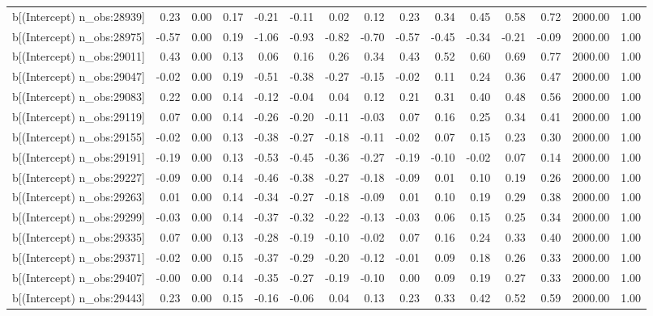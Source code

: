 \begin{table}[ht]
\begin{tabular}{rrrrrrrrrrrrrrr}
  b[(Intercept) n\_obs:28939] & 0.23 & 0.00 & 0.17 & -0.21 & -0.11 & 0.02 & 0.12 & 0.23 & 0.34 & 0.45 & 0.58 & 0.72 & 2000.00 & 1.00 \\ 
  b[(Intercept) n\_obs:28975] & -0.57 & 0.00 & 0.19 & -1.06 & -0.93 & -0.82 & -0.70 & -0.57 & -0.45 & -0.34 & -0.21 & -0.09 & 2000.00 & 1.00 \\ 
  b[(Intercept) n\_obs:29011] & 0.43 & 0.00 & 0.13 & 0.06 & 0.16 & 0.26 & 0.34 & 0.43 & 0.52 & 0.60 & 0.69 & 0.77 & 2000.00 & 1.00 \\ 
  b[(Intercept) n\_obs:29047] & -0.02 & 0.00 & 0.19 & -0.51 & -0.38 & -0.27 & -0.15 & -0.02 & 0.11 & 0.24 & 0.36 & 0.47 & 2000.00 & 1.00 \\ 
  b[(Intercept) n\_obs:29083] & 0.22 & 0.00 & 0.14 & -0.12 & -0.04 & 0.04 & 0.12 & 0.21 & 0.31 & 0.40 & 0.48 & 0.56 & 2000.00 & 1.00 \\ 
  b[(Intercept) n\_obs:29119] & 0.07 & 0.00 & 0.14 & -0.26 & -0.20 & -0.11 & -0.03 & 0.07 & 0.16 & 0.25 & 0.34 & 0.41 & 2000.00 & 1.00 \\ 
  b[(Intercept) n\_obs:29155] & -0.02 & 0.00 & 0.13 & -0.38 & -0.27 & -0.18 & -0.11 & -0.02 & 0.07 & 0.15 & 0.23 & 0.30 & 2000.00 & 1.00 \\ 
  b[(Intercept) n\_obs:29191] & -0.19 & 0.00 & 0.13 & -0.53 & -0.45 & -0.36 & -0.27 & -0.19 & -0.10 & -0.02 & 0.07 & 0.14 & 2000.00 & 1.00 \\ 
  b[(Intercept) n\_obs:29227] & -0.09 & 0.00 & 0.14 & -0.46 & -0.38 & -0.27 & -0.18 & -0.09 & 0.01 & 0.10 & 0.19 & 0.26 & 2000.00 & 1.00 \\ 
  b[(Intercept) n\_obs:29263] & 0.01 & 0.00 & 0.14 & -0.34 & -0.27 & -0.18 & -0.09 & 0.01 & 0.10 & 0.19 & 0.29 & 0.38 & 2000.00 & 1.00 \\ 
  b[(Intercept) n\_obs:29299] & -0.03 & 0.00 & 0.14 & -0.37 & -0.32 & -0.22 & -0.13 & -0.03 & 0.06 & 0.15 & 0.25 & 0.34 & 2000.00 & 1.00 \\ 
  b[(Intercept) n\_obs:29335] & 0.07 & 0.00 & 0.13 & -0.28 & -0.19 & -0.10 & -0.02 & 0.07 & 0.16 & 0.24 & 0.33 & 0.40 & 2000.00 & 1.00 \\ 
  b[(Intercept) n\_obs:29371] & -0.02 & 0.00 & 0.15 & -0.37 & -0.29 & -0.20 & -0.12 & -0.01 & 0.09 & 0.18 & 0.26 & 0.33 & 2000.00 & 1.00 \\ 
  b[(Intercept) n\_obs:29407] & -0.00 & 0.00 & 0.14 & -0.35 & -0.27 & -0.19 & -0.10 & 0.00 & 0.09 & 0.19 & 0.27 & 0.33 & 2000.00 & 1.00 \\ 
  b[(Intercept) n\_obs:29443] & 0.23 & 0.00 & 0.15 & -0.16 & -0.06 & 0.04 & 0.13 & 0.23 & 0.33 & 0.42 & 0.52 & 0.59 & 2000.00 & 1.00 \\ 

\end{tabular}
\end{table}
